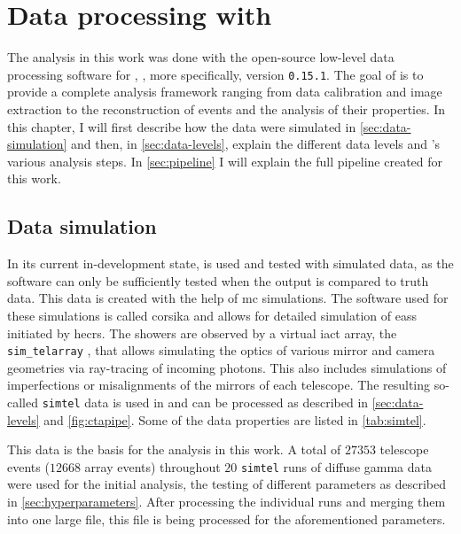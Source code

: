 \chapter{Data processing with \ctapipe{}}
\label{ch:data-processing}

The analysis in this work was done with the open-source low-level data processing software for \cta{},
\ctapipe{} \cite{ctapipe}, more specifically, version \texttt{0.15.1}.
The goal of \ctapipe{} is to provide a complete analysis
framework ranging from data calibration and image extraction to the reconstruction of events and the
analysis of their properties. In this chapter, I will first describe how the data
were simulated in \autoref{sec:data-simulation} and then, in \autoref{sec:data-levels}, explain the different
data levels and \ctapipe{}'s various analysis steps. In \autoref{sec:pipeline} I will
explain the full pipeline created for this work.


\section{Data simulation}
\label{sec:data-simulation}

In its current in-development state, \ctapipe{} is used and tested with simulated data, as the software
can only be sufficiently tested when the output is compared to truth data. This data is created with the help of
\gls{mc} simulations. The software used for these simulations is called \gls{corsika} \cite{corsika} and
allows for detailed simulation of \glspl{eas} initiated by \glspl{hecr}. The showers are observed by
a virtual \gls{iact} array, the \texttt{sim\_telarray} \cite{bernlohr2008}, that allows simulating the optics
of various mirror and camera geometries via ray-tracing of incoming photons. This also includes
simulations of imperfections or misalignments of the mirrors of each telescope. The resulting so-called
\texttt{simtel} data is used in \ctapipe{} and can be processed as described in \autoref{sec:data-levels}
and \autoref{fig:ctapipe}. Some of the data properties are listed in \autoref{tab:simtel}.

This data is the basis for the analysis in this work. A total of \(\num{27353}\) telescope events
(\(\num{12668}\) array events) throughout \(\num{20}\) \texttt{simtel} runs of diffuse gamma data
were used for the initial analysis, \ie the testing of different parameters as described in
\autoref{sec:hyperparameters}. After processing the individual runs and merging them into one large
file, this file is being processed for the aforementioned parameters.

